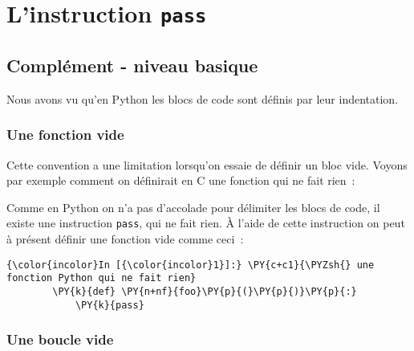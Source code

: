     \hypertarget{linstruction-pass}{%
\section{\texorpdfstring{L'instruction
\texttt{pass}}{L'instruction pass}}\label{linstruction-pass}}

    \hypertarget{compluxe9ment---niveau-basique}{%
\subsection{Complément - niveau
basique}\label{compluxe9ment---niveau-basique}}

    Nous avons vu qu'en Python les blocs de code sont définis par leur
indentation.

    \hypertarget{une-fonction-vide}{%
\subsubsection{Une fonction vide}\label{une-fonction-vide}}

    Cette convention a une limitation lorsqu'on essaie de définir un bloc
vide. Voyons par exemple comment on définirait en C une fonction qui ne
fait rien~:

    \begin{Shaded}
\begin{Highlighting}[]
\end{Highlighting}
\end{Shaded}

    Comme en Python on n'a pas d'accolade pour délimiter les blocs de code,
il existe une instruction \texttt{pass}, qui ne fait rien. À l'aide de
cette instruction on peut à présent définir une fonction vide comme
ceci~:

    \begin{Verbatim}[commandchars=\\\{\}]
{\color{incolor}In [{\color{incolor}1}]:} \PY{c+c1}{\PYZsh{} une fonction Python qui ne fait rien}
        \PY{k}{def} \PY{n+nf}{foo}\PY{p}{(}\PY{p}{)}\PY{p}{:}
            \PY{k}{pass}
\end{Verbatim}


    \hypertarget{une-boucle-vide}{%
\subsubsection{Une boucle vide}\label{une-boucle-vide}}

